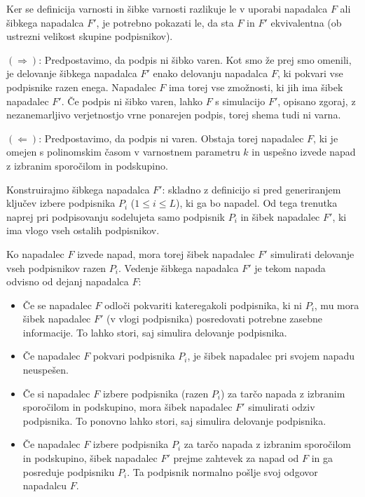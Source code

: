 \documentclass[isrm2, tisk]{fmfdelo}
\begin{document}
\begin{dokaz}
    Ker se definicija varnosti in šibke varnosti razlikuje le v uporabi napadalca $F$ ali šibkega
    napadalca $F'$, je potrebno pokazati le, da sta $F$ in $F'$ ekvivalentna (ob ustrezni velikost
    skupine podpisnikov).

    $(\Rightarrow)$: Predpostavimo, da podpis ni šibko varen. Kot smo že prej smo omenili, je delovanje
    šibkega napadalca $F'$ enako delovanju napadalca $F$, ki pokvari vse podpisnike razen enega.
    Napadalec $F$ ima torej vse zmožnosti, ki jih ima šibek napadalec $F'$. Če podpis ni šibko varen,
    lahko $F$ s simulacijo $F'$, opisano zgoraj, z nezanemarljivo verjetnostjo vrne ponarejen podpis,
    torej shema tudi ni varna.

    $(\Leftarrow)$: Predpostavimo, da podpis ni varen. Obstaja torej napadalec $F$, ki je omejen
    s polinomskim časom v varnostnem parametru $k$ in uspešno izvede napad z izbranim sporočilom in
    podskupino.

    Konstruirajmo šibkega napadalca $F'$: skladno z definicijo si pred generiranjem ključev izbere
    podpisnika $P_i$ ($1 \le i \le L$), ki ga bo napadel. Od tega trenutka naprej pri podpisovanju
    sodelujeta samo podpisnik $P_i$ in šibek napadalec $F'$, ki ima vlogo vseh ostalih podpisnikov.

    Ko napadalec $F$ izvede napad, mora torej šibek napadalec $F'$ simulirati delovanje vseh podpisnikov
    razen $P_i$. Vedenje šibkega napadalca $F'$ je tekom napada odvisno od dejanj napadalca $F$:
    \begin{itemize}
        \item Če se napadalec $F$ odloči pokvariti kateregakoli podpisnika, ki ni $P_i$, mu mora 
            šibek napadalec $F'$ (v vlogi podpisnika) posredovati potrebne zasebne informacije. To
            lahko stori, saj simulira delovanje podpisnika.
        \item Če napadalec $F$ pokvari podpisnika $P_i$, je šibek napadalec pri svojem napadu neuspešen.
        \item Če si napadalec $F$ izbere podpisnika (razen $P_i$) za tarčo napada z izbranim sporočilom
            in podskupino, mora šibek napadalec $F'$ simulirati odziv podpisnika. To ponovno lahko
            stori, saj simulira delovanje podpisnika.
        \item Če napadalec $F$ izbere podpisnika $P_i$ za tarčo napada z izbranim sporočilom in podskupino,
            šibek napadalec $F'$ prejme zahtevek za napad od $F$ in ga posreduje podpisniku $P_i$.
            Ta podpisnik normalno pošlje svoj odgovor napadalcu $F$.


\end{itemize}
\end{dokaz}
\end{document}
